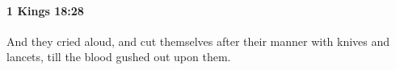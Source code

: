 
		\paragraph{1 Kings 18:28} %
			\label{1KINGS-18-28}

			And they cried aloud, and cut themselves after their manner with knives and lancets, till the blood gushed out upon them.


